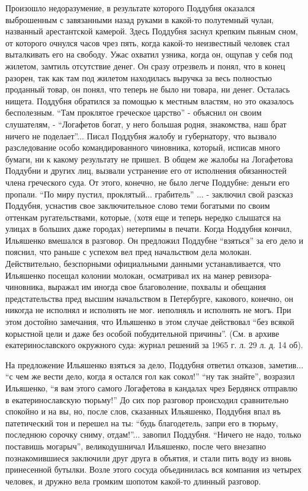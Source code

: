 Произошло недоразумение, в результате которого Поддубня оказался выброшенным с
завязанными назад руками в какой-то полутемный чулан, названный арестантской
камерой.  Здесь Поддубня заснул крепким пьяным сном, от которого очнулся часов
чрез пять, когда какой-то неизвестный человек стал выталкивать его на свободу.
Ужас охватил узника, когда он, ощупав у себя под жилетом, замтиль отсутствие
денег. Он сразу отрезвелъ и понял, что в конец разорен, так как там под жилетом
находилась выручка за весь полностью проданный товар, он понял, что теперь не
было ни товара, ни денег. Осталась нищета. Поддубня обратился за помощью к
местным властям, но это оказалось бесполезным. ``Там проклятое греческое
царство'' - объяснил он своим слушателям, - ``Логафетов богат, у него большая
родня, знакомства, наш брат ничего не поделает''...  Писал Поддубня жалобу и
губернатору, что вызвало разследование особо командированного чиновника,
который, исписав много бумаги, ни к какому результату не пришел. В общем же
жалобы на Логафетова Поддубни и других лиц, вызвали
устранение его от исполнения обязанностей члена греческого суда. От этого,
конечно, не было легче Поддубне: деньги его пропали. ``По миру пустил,
проклятый... грабитель'' ... - заключил свой разсказ Поддубня, уснастив свое
заключительное слово теми богатыми по своим оттенкам ругательствами, которые,
(хотя еще и теперь нередко слышатся на улицах в больших даже городах) нетерпимы
в печати.  Когда Ноддубня кончил, Ильяшенко вмешался в разговор. Он предложил
Поддубне ``взяться'' за его дело и пояснил, что раньше с успехом вел пред
начальством дела молокан.  Действительно, безспорными официальными данными
устанавливается, что Ильяшенко посещал колонии молокан, осматривал их на манер
ревизора-чиновника, выражал им иногда свое благоволение, похвалы и обещания
предстательства пред высшим начальством в Петербурге, какового, конечно, он
никогда не исполнял и исполнять не мог.  иеполняль и исполнять не могъ.  При
этом достойно замечания, что Ильяшенко в этом случае действовал ``без всякой
корыстной цели и даже без особой побудительной причины''. (См. в архиве
екатеринославского окружного суда: журнал решений за 1965 г. л. 29 л. д. 14
об).

На предложение Ильяшенко взяться за дело, Поддубня ответил отказов, заметив...
``с чем же вести дело, когда я остался гол как сокол!'' ``ну так знайте'', возразил Ильяшенко, ``я вам этого самого 
Логафетова в кандалах чрез Бердянск отправлю в екатеринославскую тюрьму!''
До сих пор разговор происходил сравнительно
спокойно и на вы, но, после слов, сказанных Ильяшенко,
Поддубня впал въ патетический тон и перешел на ты:
``будь благодетель, запри его в тюрьму, последнюю сорочку сниму, отдам!''... завопил Поддубня. ``Ничего не надо,
только поставишь могарыч'', великодушничал Ильяшенко, 
после чего внезапно познакомившиеся заключили друг друга в объятия, 
и стали пить воду из вновь принесенной бутылки. Возле этого сосуда объединилась вся компания из
четырех человек, и дружно вела громким шопотом какой-то длинный разговор.

